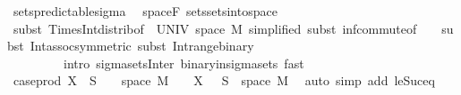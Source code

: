 \begin{isabellebody}
\ sets{\isacharunderscore}{\kern0pt}predictable{\isacharunderscore}{\kern0pt}sigma\ \isamarkupfalse%
\ space{\isacharunderscore}{\kern0pt}F\ sets{\isachardot}{\kern0pt}sets{\isacharunderscore}{\kern0pt}into{\isacharunderscore}{\kern0pt}space\isanewline
\ \ \ \ \ \ \isamarkupfalse%
\ {\isacharparenleft}{\kern0pt}subst\ Times{\isacharunderscore}{\kern0pt}Int{\isacharunderscore}{\kern0pt}distrib{}{\isacharbrackleft}{\kern0pt}of\ {\isachardoublequoteopen}{\isacharbraceleft}{\kern0pt}{}{\isacharbraceright}{\kern0pt}{\isachardoublequoteclose}\ UNIV\ {\isachardoublequoteopen}space\ M{\isachardoublequoteclose}{\isacharcomma}{\kern0pt}\ simplified{\isacharbrackright}{\kern0pt}{\isacharcomma}{\kern0pt}\ subst\ inf{\isachardot}{\kern0pt}commute{\isacharbrackleft}{\kern0pt}of\ {\isachardoublequoteopen}{\isacharunderscore}{\kern0pt}\ {\isasymtimes}\ {\isacharunderscore}{\kern0pt}{\isachardoublequoteclose}{\isacharbrackright}{\kern0pt}{\isacharcomma}{\kern0pt}\ subst\ Int{\isacharunderscore}{\kern0pt}assoc{\isacharbrackleft}{\kern0pt}symmetric{\isacharbrackright}{\kern0pt}{\isacharcomma}{\kern0pt}\ subst\ Int{\isacharunderscore}{\kern0pt}range{\isacharunderscore}{\kern0pt}binary{\isacharparenright}{\kern0pt}\ \isanewline
\ \ \ \ \ \ \ \ \ {\isacharparenleft}{\kern0pt}intro\ sigma{\isacharunderscore}{\kern0pt}sets{\isacharunderscore}{\kern0pt}Inter\ binary{\isacharunderscore}{\kern0pt}in{\isacharunderscore}{\kern0pt}sigma{\isacharunderscore}{\kern0pt}sets{\isacharcomma}{\kern0pt}\ fast{\isacharparenright}{\kern0pt}{\isacharplus}{\kern0pt}\isanewline
\ \ \ \ \isamarkupfalse%
\ \isamarkupfalse%
\ {\isachardoublequoteopen}case{\isacharunderscore}{\kern0pt}prod\ X\ {\isacharminus}{\kern0pt}{\isacharbackquote}{\kern0pt}\ S\ {\isasyminter}\ {\isacharparenleft}{\kern0pt}{\isacharbraceleft}{\kern0pt}{}{\isacharbraceright}{\kern0pt}\ {\isasymtimes}\ space\ M{\isacharparenright}{\kern0pt}\ {\isacharequal}{\kern0pt}\ {\isacharbraceleft}{\kern0pt}{}{\isacharbraceright}{\kern0pt}\ {\isasymtimes}\ {\isacharparenleft}{\kern0pt}X\ {}\ {\isacharminus}{\kern0pt}{\isacharbackquote}{\kern0pt}\ S\ {\isasyminter}\ space\ M{\isacharparenright}{\kern0pt}{\isachardoublequoteclose}\ \isamarkupfalse%
\ {\isacharparenleft}{\kern0pt}auto\ simp\ add{\isacharcolon}{\kern0pt}\ le{\isacharunderscore}{\kern0pt}Suc{\isacharunderscore}{\kern0pt}eq{\isacharparenright}{\kern0pt}\isanewline
\ \ \ \ \isamarkupfalse%
\ \isamarkupfalse%

\end{isabellebody}

